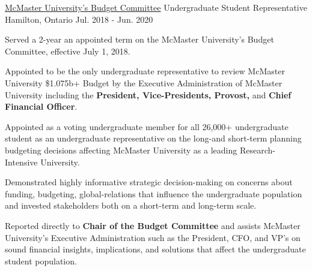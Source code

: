 \begin{cventries}
  \cventry
    {\href{https://financial-affairs.mcmaster.ca/services/budgeting/budget-committee/2018-19-membership-listing/}{McMaster University's Budget Committee}} %
    {Undergraduate Student Representative} %
    {Hamilton, Ontario} %
    {Jul. 2018 - Jun. 2020} %
     {\renewcommand{\labelitemii}{\bullet}
      \begin{cvitems}%
        \vspace{0.1cm}
                \item {Served a 2-year an appointed term on the McMaster University's Budget Committee, effective July 1, 2018.}
                \item {Appointed to be the only undergraduate representative to review McMaster University \$1.075b+ Budget by the Executive Administration of McMaster University including the \textbf{President, Vice-Presidents, Provost,} and \textbf{Chief Financial Officer}.}
                \item {Appointed as a voting undergraduate member for all 26,000+ undergraduate student as an undergraduate representative on the long-and short-term planning budgeting decisions affecting McMaster University as a leading Research-Intensive University.}
                \item {Demonstrated highly informative strategic decision-making on concerns about funding, budgeting, global-relations that influence the undergraduate population and invested stakeholders both on a short-term and long-term scale.}
                \item {Reported directly to \textbf{Chair of the Budget Committee} and assists McMaster University's Executive Administration such as the \newline President, CFO, and VP's on sound financial insights, implications, and solutions that affect the undergraduate student population.}
      \end{cvitems}
    }


\end{cventries}
